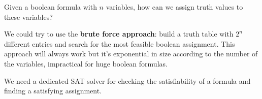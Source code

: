 Given a boolean formula with $n$ variables, how can we assign truth values to these variables? \vspace{7pt}

We could try to use the \textbf{brute force approach}: build a truth table with $2^n$ different entries and search for the most feasible boolean assignment.
This approach will always work but it's exponential in size according to the number of the variables, impractical for huge boolean formulas. \vspace{7pt}

We need a dedicated SAT solver for checking the satisfiability of a formula and finding a satisfying assignment.